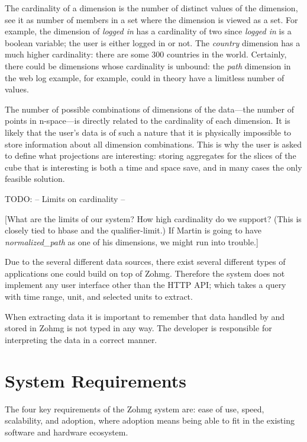 The cardinality of a dimension is the number of distinct values of the
dimension, see it as number of members in a set where the dimension is
viewed as a set. For example, the dimension of \textit{logged in} has a
cardinality of two since \textit{logged in} is a boolean variable; the user
is either logged in or not. The \textit{country} dimension has a much
higher cardinality: there are some 300 countries in the world. Certainly,
there could be dimensions whose cardinality is unbound: the \textit{path}
dimension in the web log example, for example, could in theory have a
limitless number of values.

The number of possible combinations of dimensions of the data---the number
of points in n-space---is directly related to the cardinality of each
dimension. It is likely that the user's data is of such a nature that it is
physically impossible to store information about all dimension
combinations.  This is why the user is asked to define what projections are
interesting: storing aggregates for the slices of the cube that is
interesting is both a time and space save, and in many cases the only
feasible solution.

TODO: -- Limits on cardinality --

[What are the limits of our system? How high cardinality do we support? (This
is closely tied to hbase and the qualifier-limit.) If Martin is going to have
\textit{normalized\_path} as one of his dimensions, we might run into trouble.]


Due to the several different data sources, there exist several different types
of applications one could build on top of Zohmg. Therefore the system does not
implement any user interface other than the HTTP API; which takes a query with
time range, unit, and selected units to extract.

When extracting data it is important to remember that data handled by and stored
in Zohmg is not typed in any way. The developer is responsible for interpreting
the data in a correct manner.



\section{System Requirements}


The four key requirements of the Zohmg system are: ease of use, speed,
scalability, and adoption, where adoption means being able to fit in the
existing software and hardware ecosystem.

